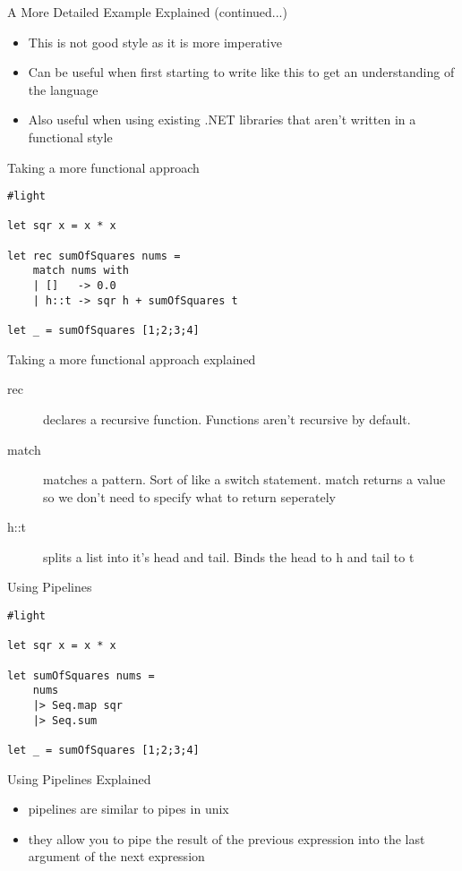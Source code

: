 \documentclass[landscape]{slides}
\begin{document}
\begin{slide}{A More Detailed Example Explained (continued...)}
\begin{itemize}
\item This is not good style as it is more imperative
\item Can be useful when first starting to write like this to get an understanding of the language
\item Also useful when using existing .NET libraries that aren't written in a functional style
\end{itemize}
\end{slide}

\begin{slide}{Taking a more functional approach}
\begin{verbatim}
#light

let sqr x = x * x

let rec sumOfSquares nums =
    match nums with
    | []   -> 0.0
    | h::t -> sqr h + sumOfSquares t

let _ = sumOfSquares [1;2;3;4]
\end{verbatim}
\end{slide}

\begin{slide}{Taking a more functional approach explained}
\begin{description}
\item[rec] declares a recursive function. Functions aren't recursive by default.
\item[match] matches a pattern. Sort of like a switch statement. match returns a value so we don't need to specify what to return seperately
\item[h::t] splits a list into it's head and tail. Binds the head to h and tail to t
\end{description}
\end{slide}

\begin{slide}{Using Pipelines}
\begin{verbatim}
#light

let sqr x = x * x

let sumOfSquares nums =
    nums 
    |> Seq.map sqr
    |> Seq.sum

let _ = sumOfSquares [1;2;3;4]
\end{verbatim}
\end{slide}

\begin{slide}{Using Pipelines Explained}
\begin{itemize}
\item pipelines are similar to pipes in unix
\item they allow you to pipe the result of the previous expression into the last argument of the next expression
\end{itemize}
\end{slide}
\end{document}
